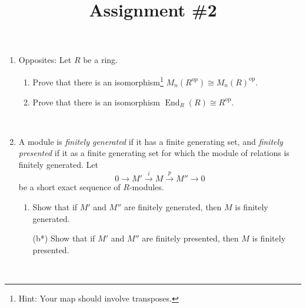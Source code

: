 \documentclass{amsart}[12pt]
\title{Assignment \#2}
\def\End{\operatorname{End}}
\numberwithin{equation}{section}
\theoremstyle{plain} %
\theoremstyle{definition}
\theoremstyle{remark}
\newcommand{\xra}[1]{\xrightarrow{#1}}
\begin{document}
\onehalfspacing

\maketitle




\begin{enumerate}

\item Opposites: Let $R$ be a ring.
\begin{enumerate}
\item Prove that there is an isomorphism\footnote{Hint: Your map should involve transposes.} $M_n(R^\mathrm{op}) \cong M_n(R)^{\mathrm{op}}$.
\item Prove that there is an isomorphism $\End_R(R) \cong R^{\mathrm{op}}$.
\end{enumerate}

\

\item A module is \emph{finitely generated} if it has a finite generating set, and \emph{finitely presented} if it as a finite generating set for which the module of relations is finitely generated. Let 
\[0 \to M' \xra{i} M \xra{p} M'' \to 0\] be a short exact sequence of $R$-modules.
\begin{enumerate}
\item Show that if $M'$ and $M''$ are finitely generated, then $M$ is finitely generated.
\item[(b*)] Show that if $M'$ and $M''$ are finitely presented, then $M$ is finitely presented. 
\end{enumerate}

\



\end{enumerate}
\end{document}
